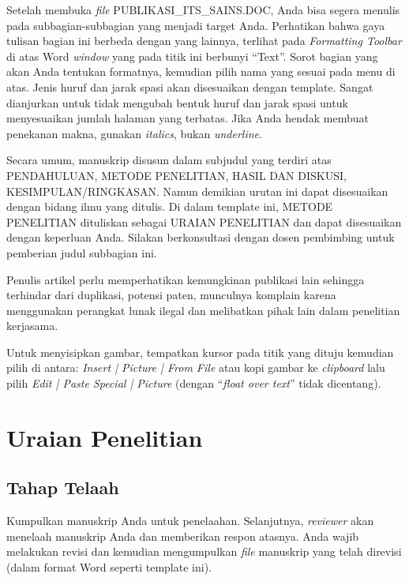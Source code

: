 \documentclass{its-jurnal}
\begin{document}
Setelah membuka \textit{file} PUBLIKASI\_ITS\_SAINS.DOC, Anda bisa segera menulis pada subbagian-subbagian yang menjadi target Anda. Perhatikan bahwa gaya tulisan bagian ini berbeda dengan yang lainnya, terlihat pada \textit{Formatting Toolbar} di atas Word \textit{window} yang pada titik ini berbunyi ``Text''. Sorot bagian yang akan Anda tentukan formatnya, kemudian pilih nama yang sesuai pada menu di atas. Jenis huruf dan jarak spasi akan disesuaikan dengan template. Sangat dianjurkan untuk tidak mengubah bentuk huruf dan jarak spasi untuk menyesuaikan jumlah halaman yang terbatas. Jika Anda hendak membuat penekanan makna, gunakan \textit{italics}, bukan \textit{underline}.

Secara umum, manuskrip disusun dalam subjudul yang terdiri atas PENDAHULUAN, METODE PENELITIAN, HASIL DAN DISKUSI, KESIMPULAN/RINGKASAN. Namun demikian urutan ini dapat disesuaikan dengan bidang ilmu yang ditulis. Di dalam template ini, METODE PENELITIAN dituliskan sebagai URAIAN PENELITIAN dan dapat disesuaikan dengan keperluan Anda. Silakan berkonsultasi dengan dosen pembimbing untuk pemberian judul subbagian ini.

Penulis artikel perlu memperhatikan kemungkinan publikasi lain sehingga terhindar dari duplikasi, potensi paten, munculnya komplain karena menggunakan perangkat lunak ilegal dan melibatkan pihak lain dalam penelitian kerjasama.

Untuk menyisipkan gambar, tempatkan kursor pada titik yang dituju kemudian pilih di antara: \textit{Insert | Picture | From File} atau kopi gambar ke \textit{clipboard} lalu pilih \textit{Edit | Paste Special | Picture} (dengan ``\textit{float over text}'' tidak dicentang).

\section{Uraian Penelitian}

\subsection{Tahap Telaah}
Kumpulkan manuskrip Anda untuk penelaahan. Selanjutnya, \textit{reviewer} akan menelaah manuskrip Anda dan memberikan respon atasnya. Anda wajib melakukan revisi dan kemudian mengumpulkan \textit{file} manuskrip yang telah direvisi (dalam format Word seperti template ini).
\end{document}
